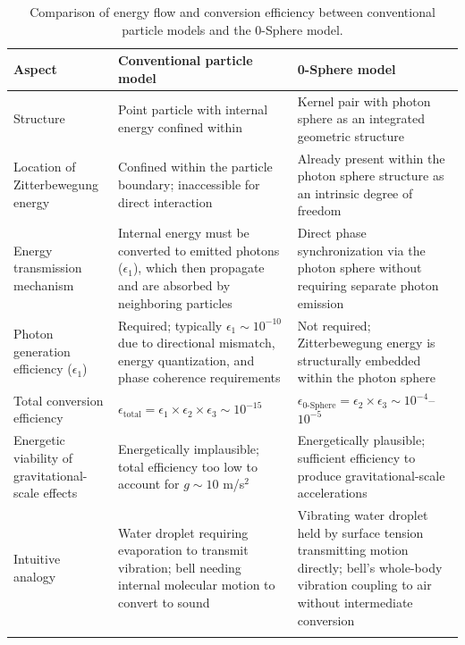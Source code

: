 \documentclass[
 reprint,
 amsmath,amssymb,
 aps,
 prb,
]{revtex4-2}
\numberwithin{equation}{section}
\begin{document}
\begin{table}[th!]
\centering
\caption{Comparison of energy flow and conversion efficiency between conventional particle models and the 0-Sphere model.}
\label{tab:energy_flow_comparison}
\renewcommand{\arraystretch}{1.4}
\begin{tabular}{p{5.0cm}p{6.0cm}p{6.0cm}}
\toprule
\textbf{Aspect} & \textbf{Conventional particle model} & \textbf{0-Sphere model} \\
\midrule
Structure
& Point particle with internal energy confined within
& Kernel pair with photon sphere as an integrated geometric structure \\
\addlinespace[0.25cm]
Location of Zitterbewegung energy
& Confined within the particle boundary; inaccessible for direct interaction
& Already present within the photon sphere structure as an intrinsic degree of freedom \\
\addlinespace[0.25cm]
Energy transmission mechanism
& Internal energy must be converted to emitted photons ($\epsilon_1$), which then propagate and are absorbed by neighboring particles
& Direct phase synchronization via the photon sphere without requiring separate photon emission \\
\addlinespace[0.25cm]
Photon generation efficiency ($\epsilon_1$)
& Required; typically $\epsilon_1 \sim 10^{-10}$ due to directional mismatch, energy quantization, and phase coherence requirements
& Not required; Zitterbewegung energy is structurally embedded within the photon sphere \\
\addlinespace[0.25cm]
Total conversion efficiency
& $\epsilon_{\text{total}} = \epsilon_1 \times \epsilon_2 \times \epsilon_3 \sim 10^{-15}$
& $\epsilon_{\text{0-Sphere}} = \epsilon_2 \times \epsilon_3 \sim 10^{-4}$--$10^{-5}$ \\
\addlinespace[0.25cm]
Energetic viability of gravitational-scale effects
& Energetically implausible; total efficiency too low to account for $g \sim 10$ m/s$^2$
& Energetically plausible; sufficient efficiency to produce gravitational-scale accelerations \\
\addlinespace[0.25cm]
Intuitive analogy
& Water droplet requiring evaporation to transmit vibration; bell needing internal molecular motion to convert to sound
& Vibrating water droplet held by surface tension transmitting motion directly; bell's whole-body vibration coupling to air without intermediate conversion \\
\addlinespace[0.20cm]
\bottomrule
\end{tabular}
\vspace{0.4em}

\end{table}
\end{document}
